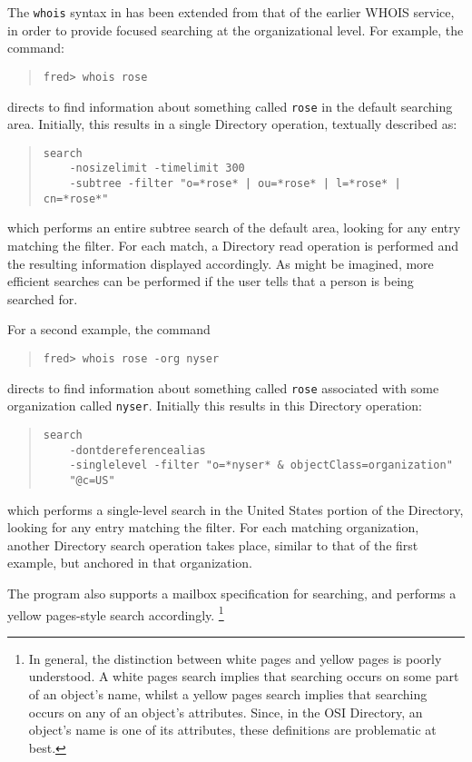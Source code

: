 The \verb"whois" syntax in  has been extended from that of the
earlier WHOIS service,
in order to provide focused searching at the organizational level.
For example, the command:
\begin{quote}\small\begin{verbatim}
fred> whois rose
\end{verbatim}\end{quote}
directs  to find information about something called \verb"rose" in
the default searching area.
Initially,
this results in a single Directory operation,
textually described as:
\begin{quote}\small\begin{verbatim}
search
    -nosizelimit -timelimit 300
    -subtree -filter "o=*rose* | ou=*rose* | l=*rose* | cn=*rose*"
\end{verbatim}\end{quote}
which performs an entire subtree search of the default area,
looking for any entry matching the filter.
For each match,
a Directory read operation is performed and the resulting information
displayed accordingly.
As might be imagined,
more efficient searches can be performed if the user tells  that a
person is being searched for.

For a second example, the command
\begin{quote}\small\begin{verbatim}
fred> whois rose -org nyser
\end{verbatim}\end{quote}
directs  to find information about something called \verb"rose"
associated with some organization called \verb"nyser".
Initially this results in this Directory operation:
\begin{quote}\small\begin{verbatim}
search
    -dontdereferencealias
    -singlelevel -filter "o=*nyser* & objectClass=organization"
    "@c=US"
\end{verbatim}\end{quote}
which performs a single-level search in the United States portion of the
Directory,
looking for any entry matching the filter.
For each matching organization,
another Directory search operation takes place,
similar to that of the first example,
but anchored in that organization.

The  program also supports a mailbox specification for searching,
and performs a yellow pages-style search accordingly.%
\footnote{In general,
the distinction between white pages and yellow pages is poorly understood.
A white pages search implies that searching occurs on some part of an object's
name,
whilst a yellow pages search implies that searching occurs on any of an
object's attributes.
Since, in the OSI Directory,
an object's name is one of its attributes,
these definitions are problematic at best.}

